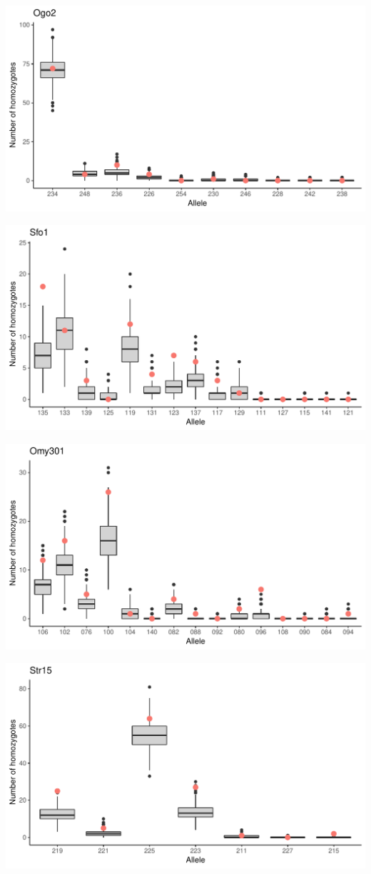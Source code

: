 \documentclass[a4paper]{scrartcl}\usepackage[]{graphicx}\usepackage[]{color}
\makeatletter
\def\maxwidth{ %
  \ifdim\Gin@nat@width>\linewidth
    \linewidth
  \else
    \Gin@nat@width
  \fi
}
\newenvironment{knitrout}{}{} %
\makeatother
\begin{document}
\begin{knitrout}
\includegraphics[width=\maxwidth]{PopGenReport_Hatchery-null_all-4} 

\includegraphics[width=\maxwidth]{PopGenReport_Hatchery-null_all-5} 

\includegraphics[width=\maxwidth]{PopGenReport_Hatchery-null_all-6} 

\includegraphics[width=\maxwidth]{PopGenReport_Hatchery-null_all-7} 


\end{knitrout}
\end{document}
